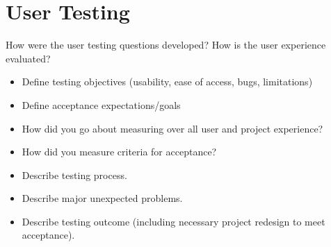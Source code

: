 \chapter{User Testing}
How were the user testing questions developed? How is the user experience evaluated?
\begin {itemize} 
\item Define testing objectives (usability, ease of access, bugs, limitations)
\item Define acceptance expectations/goals
\item How did you go about measuring over all user and project experience?
\item How did you measure criteria for acceptance?
\item Describe testing process.
\item Describe major unexpected problems.
\item Describe testing outcome (including necessary project redesign to meet acceptance).
\end {itemize}

